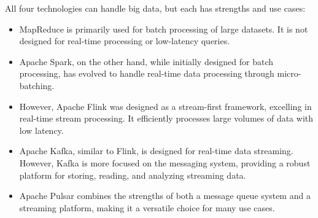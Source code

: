 All four technologies can handle big data, but each has strengths and use cases:

\begin{itemize}
    \item MapReduce is primarily used for batch processing of large datasets. It is not designed for real-time processing or low-latency queries.
    \item Apache Spark, on the other hand, while initially designed for batch processing, has evolved to handle real-time data processing through micro-batching.
    \item However, Apache Flink was designed as a stream-first framework, excelling in real-time stream processing. It efficiently processes large volumes of data with low latency.
    \item Apache Kafka, similar to Flink, is designed for real-time data streaming. However, Kafka is more focused on the messaging system, providing a robust platform for storing, reading, and analyzing streaming data.
    \item Apache Pulsar combines the strengths of both a message queue system and a streaming platform, making it a versatile choice for many use cases.
\end{itemize}
